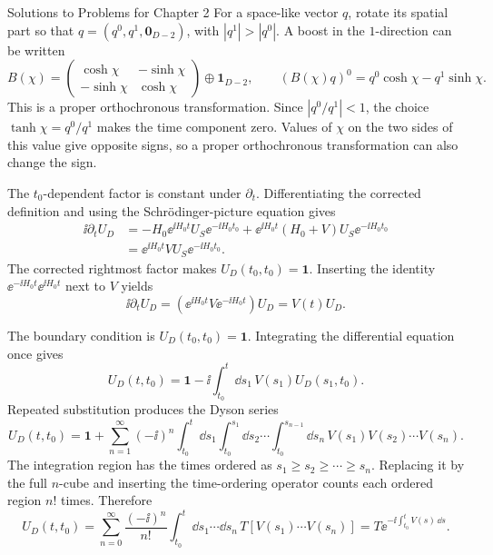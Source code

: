 \begin{bankssolutions}{Solutions to Problems for Chapter 2}
For a space-like vector $q$, rotate its spatial part so that $q=(q^{0},q^{1},\mathbf 0_{D-2})$, with $|q^{1}|>|q^{0}|$. A boost in the $1$-direction can be written
\[
  B(\chi)=
  \begin{pmatrix}
    \cosh\chi&-\sinh\chi\\[-2pt]
    -\sinh\chi&\cosh\chi
  \end{pmatrix}
    \oplus\mathbf 1_{D-2},
  \qquad
  (B(\chi)q)^{0}=q^{0}\cosh\chi-q^{1}\sinh\chi.
\]
This is a proper orthochronous transformation. Since $|q^{0}/q^{1}|<1$, the choice
$\tanh\chi=q^{0}/q^{1}$ makes the time component zero. Values of $\chi$ on the two sides of this value give opposite signs, so a proper orthochronous transformation can also change the sign.

The $t_{0}$-dependent factor is constant under $\partial_{t}$. Differentiating the corrected definition and using the Schrödinger-picture equation gives
\begin{align*}
  \ii\partial_{t}U_{D}
  &= -H_{0}\ee^{\ii H_{0}t}U_{S}\ee^{-\ii H_{0}t_{0}}
     +\ee^{\ii H_{0}t}(H_{0}+V)U_{S}\ee^{-\ii H_{0}t_{0}}\\
  &=\ee^{\ii H_{0}t}V U_{S}\ee^{-\ii H_{0}t_{0}}.
\end{align*}
The corrected rightmost factor makes $U_D(t_{0},t_{0})=\mathbf 1$. Inserting the identity $\ee^{-\ii H_{0}t}\ee^{\ii H_{0}t}$ next to $V$ yields
\[
  \ii\partial_{t}U_{D}
  =\left(\ee^{\ii H_{0}t}V\ee^{-\ii H_{0}t}\right)U_{D}
  =V(t)U_{D}.
\]

The boundary condition is $U_{D}(t_{0},t_{0})=\mathbf 1$. Integrating the differential equation once gives
\[
  U_{D}(t,t_{0})=\mathbf 1-\ii\int_{t_{0}}^{t}\dd s_{1}\,V(s_{1})U_{D}(s_{1},t_{0}).
\]
Repeated substitution produces the Dyson series
\[
  U_{D}(t,t_{0})=\mathbf 1+
  \sum_{n=1}^{\infty}(-\ii)^{n}
  \int_{t_{0}}^{t}\dd s_{1}\int_{t_{0}}^{s_{1}}\dd s_{2}\cdots
  \int_{t_{0}}^{s_{n-1}}\dd s_{n}\,
  V(s_{1})V(s_{2})\cdots V(s_{n}).
\]
The integration region has the times ordered as $s_{1}\geq s_{2}\geq\cdots\geq s_{n}$. Replacing it by the full $n$-cube and inserting the time-ordering operator counts each ordered region $n!$ times. Therefore
\[
  U_{D}(t,t_{0})
  =\sum_{n=0}^{\infty}\frac{(-\ii)^{n}}{n!}
    \int_{t_{0}}^{t}\dd s_{1}\cdots\dd s_{n}\,
    T\!\left[V(s_{1})\cdots V(s_{n})\right]
  =T\ee^{-\ii\int_{t_{0}}^{t}V(s)\,\dd s}.
\]


\end{bankssolutions}
